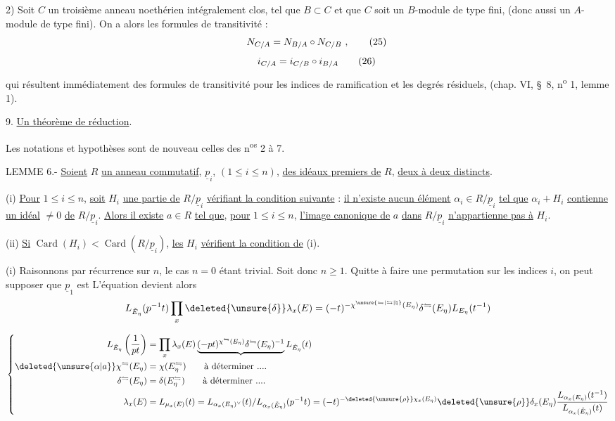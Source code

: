 2) Soit $C$ un troisième anneau noethérien intégralement clos, tel que $B\subset C$ et que $C$ soit un $B$-module de type fini, (donc aussi un $A$-module de type fini). On a alors les formules de transitivité :
\[
N_{C/A}=N_{B/A}\circ N_{C/B}\ ,\tag*{\makebox[0pt][r]{\makebox[\displaywidth][l]{(25)}}}
\]
\[
i_{C/A}=i_{C/B}\circ i_{B/A}\tag*{\makebox[0pt][r]{\makebox[\displaywidth][l]{(26)}}}
\]
qui résultent immédiatement des formules de transitivité pour les indices de ramification et les degrés résiduels, (chap. VI, \S~8, n\textsuperscript{o} 1, lemme 1).

9. \uline{Un théorème de réduction}.

Les notations et hypothèses sont de nouveau celles des n\textsuperscript{os} 2 à 7.

LEMME 6.- \uline{Soient} $R$ \uline{un anneau commutatif}, $\underline p_i$, $(1\leq i\leq n)$, \uline{des idéaux premiers de} $R$, \uline{deux à deux distincts}.

(i) \uline{Pour} $1\leq i\leq n$, \uline{soit} $H_i$ \uline{une partie de} $R/\underline p_i$ \uline{vérifiant la condition suivante} : \uline{il n'existe aucun élément} $\alpha_i\in R/\underline p_i$ \uline{tel que} $\alpha_i+H_i$ \uline{contienne un idéal} $\neq 0$ \uline{de} $R/\underline p_i$. \uline{Alors il existe} $a\in R$ \uline{tel que}, \uline{pour} $1\leq i\leq n$, \uline{l'image canonique de} $a$ \uline{dans} $R/\underline p_i$ \uline{n'appartienne pas à} $H_i$.

(ii) \uline{Si} $\operatorname{Card}(H_i)<\operatorname{Card}(R/\underline p_i)$, \uline{les} $H_i$ \uline{vérifient la condition de} (i).

(i) Raisonnons par récurrence sur $n$, le cas $n=0$ étant trivial. Soit donc $n\geq 1$. Quitte à faire une permutation sur les indices $i$, on peut supposer que $\underline p_1$ est
L'équation  devient alors
\[
L_{\check E_\eta}(p^{-1}t)\prod_x\deleted{\unsure{\delta}}\lambda_x(E)=(-t)^{-\chi^{\unsure{\leftrightharpoons|\leftrightarrows|\natural}}(E_\eta)}\delta^{\leftrightharpoons}(E_\eta)L_{E_\eta}(t^{-1})
\]

\[
\left\{\begin{aligned}
L_{\check E_\eta}\left(\frac1{pt}\right)&=\prod_x\lambda_x(E)\underbrace{(-pt)^{\chi^{\leftrightharpoons}(E_\eta)}\delta^{\leftrightharpoons}(E_\eta)^{-1}}L_{\check E_\eta}(t)\\
\deleted{\unsure{\alpha|a}}\chi^{\leftrightharpoons}(E_\eta)&=\chi(E_\eta^{\leftrightharpoons})\qquad \text{à déterminer ....}\\
\delta^{\leftrightharpoons}(E_\eta)&=\delta(E_\eta^{\leftrightharpoons})\qquad \text{à déterminer ....}\\
\lambda_x(E)&=L_{\mu_x(E)}(t)=L_{\alpha_x(E_\eta)^\vee}(t)/L_{\alpha_x(\check E_\eta)}(p^{-1}t)
=(-t)^{-\deleted{\unsure{\rho}}\chi_x(E_\eta)}\deleted{\unsure{\rho}}\delta_x(E_\eta)\frac{L_{\alpha_x(E_\eta)}(t^{-1})}{L_{\alpha_x(\check E_\eta)}(t)}
\end{aligned}\right.
\]

